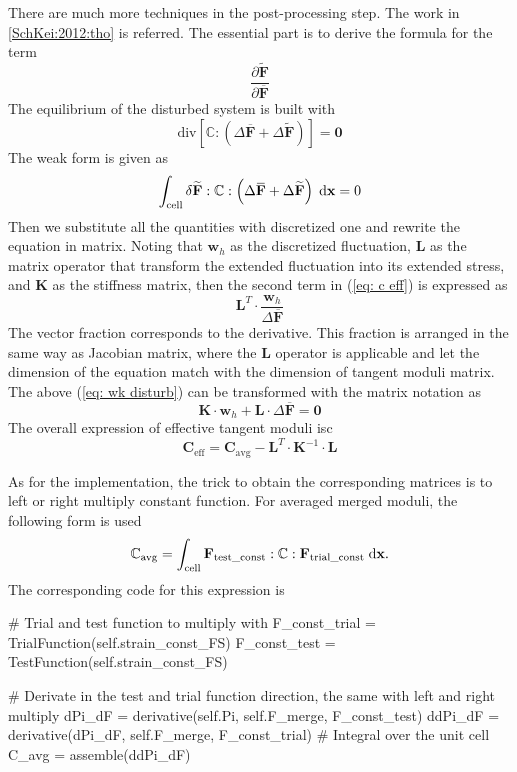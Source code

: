There are much more techniques in the post-processing step. The work in \ref{SchKei:2012:tho} is referred. The essential part is to derive the formula for the term 
\[
\dfrac{\partial \widetilde{\mathbf{F}}}{\partial \overbar{\mathbf{F}}}
\]
The equilibrium of the disturbed system is built with
\[
\text{div} \left[ \mathbb{C} : \left( \Delta \overbar{\mathbf{F}} + \Delta \widetilde{\mathbf{F}} \right) \right] = \mathbf{0}
\]
The weak form is given as
\begin{equation}
\label{eq: wk disturb}
\int_{\text{cell}} \delta \widetilde{\mathbf{F}} : \mathbb{C} : \left( \Delta \overbar{\mathbf{F}} + \Delta \widetilde{\mathbf{F}} \right) \myd{\mathbf{x}} = 0
\end{equation}
Then we substitute all the quantities with discretized one and rewrite the equation in matrix. Noting that $\mathbf{w}_{h}$ as the discretized fluctuation, $\mathbf{L}$ as the matrix operator that transform the extended fluctuation into its extended stress, and $\mathbf{K}$ as the stiffness matrix, then the second term in (\ref{eq: c eff}) is expressed as
\begin{equation}
\mathbf{L}^{T} \cdot \dfrac{\mathbf{w}_{h}}{\Delta \overbar{\mathbf{F}}} 
\end{equation}
The vector fraction corresponds to the derivative. This fraction is arranged in the same way as Jacobian matrix, where the $\mathbf{L}$ operator is applicable and let the dimension of the equation match with the dimension of tangent moduli matrix. The above (\ref{eq: wk disturb}) can be transformed with the matrix notation as
\begin{equation}
\mathbf{K} \cdot \mathbf{w}_{h} + \mathbf{L} \cdot \Delta \overbar{\mathbf{F}} = \mathbf{0}
\end{equation}
The overall expression of effective tangent moduli isc
\begin{equation}
\mathbf{C}_{\text{eff}} = \mathbf{C}_{\text{avg}} - \mathbf{L}^{T} \cdot \mathbf{K}^{-1} \cdot \mathbf{L}
\end{equation}

As for the implementation, the trick to obtain the corresponding matrices is to left or right multiply constant function. For averaged merged moduli, the following form is used
\begin{equation}
\mathbb{C}_{\text{avg}} = \int_{\text{cell}} \mathbf{F}_{\text{test\_const}}: \mathbb{C} : \mathbf{F}_{\text{trial\_const}} \;\mathrm{d}{\mathbf{x}}.
\end{equation}
The corresponding code for this expression is 
\begin{python}
# Trial and test function to multiply with
F_const_trial = TrialFunction(self.strain_const_FS)
F_const_test = TestFunction(self.strain_const_FS)

# Derivate in the test and trial function direction, the same with left and right multiply
dPi_dF = derivative(self.Pi, self.F_merge, F_const_test)
ddPi_dF = derivative(dPi_dF, self.F_merge, F_const_trial)
# Integral over the unit cell
C_avg = assemble(ddPi_dF)
\end{python}

